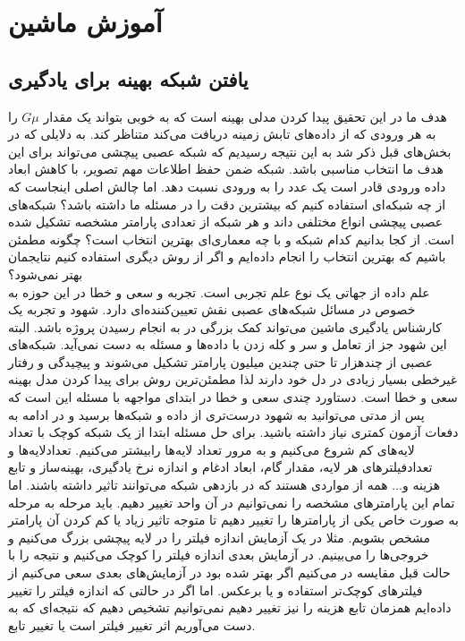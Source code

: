 
\section{آموزش ماشین}
\label{sec:training}

\subsection{یافتن شبکه بهینه برای یادگیری }
\label{subsec:try&error}

هدف ما در این تحقیق پیدا کردن مدلی بهینه است که به خوبی بتواند یک مقدار $G\mu$ را به هر ورودی که از داده‌های تابش زمینه دریافت می‌کند متناظر کند. به دلایلی که در بخش‌های قبل ذکر شد به این نتیجه رسیدیم که شبکه عصبی پیچشی می‌تواند برای این هدف ما انتخاب مناسبی باشد. شبکه  ضمن حفظ اطلاعات مهم تصویر، با کاهش ابعاد داده ورودی قادر است یک عدد را به ورودی نسبت دهد. اما چالش اصلی اینجاست که از چه شبکه‌ای استفاده کنیم که بیشترین دقت را در مسئله ما داشته باشد؟ شبکه‌های عصبی پیچشی انواع مختلفی داند و هر شبکه از تعدادی پارامتر مشخصه تشکیل شده است. از کجا بدانیم کدام شبکه و با چه معماری‌ای بهترین انتخاب است؟ چگونه مطمئن باشیم که بهترین انتخاب را انجام داده‌ایم و اگر از روش دیگری استفاده کنیم نتایجمان بهتر نمی‌شود؟
\\
علم داده از جهاتی یک نوع علم تجربی است. تجربه و سعی و خطا در این حوزه به خصوص در مسائل شبکه‌های عصبی نقش تعیین‌کننده‌ای دارد. شهود و تجربه یک کارشناس یادگیری ماشین می‌تواند کمک بزرگی در به انجام رسیدن پروژه باشد. البته این شهود جز از تعامل و سر و کله زدن با داده‌ها و مسئله به دست نمی‌آید. شبکه‌های عصبی از چندهزار تا حتی چندین میلیون پارامتر تشکیل می‌شوند و پیچیدگی و رفتار غیرخطی بسیار زیادی در دل خود دارند لذا مطمئن‌ترین روش برای پیدا کردن مدل بهینه سعی و خطا است. دستاورد چندی سعی و خطا در ابتدای مواجهه با مسئله این است که پس از مدتی می‌توانید به شهود درست‌تری از داده و شبکه‌ها برسید و در ادامه به دفعات آزمون کمتری نیاز داشته باشید.
برای حل مسئله ابتدا از یک شبکه کوچک با تعداد لایه‌های کم شروع می‌کنیم و به مرور تعداد لایه‌ها رابیشتر می‌کنیم. تعدادلایه‌ها و تعدادفیلترهای هر لایه، مقدار گام، ابعاد ادغام و اندازه نرخ یادگیری، بهینه‌ساز و تابع هزینه و... همه از مواردی هستند که در بازدهی شبکه می‌توانند تاثیر داشته باشند. اما تمام این پارامترهای مشخصه را نمی‌توانیم در آن واحد تغییر دهیم. باید مرحله به مرحله به صورت خاص یکی از پارامترها را تغییر دهیم تا متوجه تاثیر زیاد یا کم کردن آن پارامتر مشخص بشویم. مثلا در یک آزمایش اندازه فیلتر را در لایه پیچشی بزرگ می‌کنیم و خروجی‌ها را می‌بینیم. در آزمایش بعدی اندازه فیلتر را کوچک می‌کنیم و نتیجه را با حالت قبل مقایسه در می‌کنیم اگر بهتر شده بود در آزمایش‌های بعدی سعی می‌کنیم از فیلترهای کوچک‌تر استفاده و یا برعکس. اما اگر در حالتی که اندازه فیلتر را تغییر داده‌ایم همزمان تابع هزینه را نیز تغییر دهیم نمی‌توانیم تشخیص دهیم که نتیجه‌ای که به دست می‌آوریم اثر تغییر فیلتر است یا تغییر تابع.
